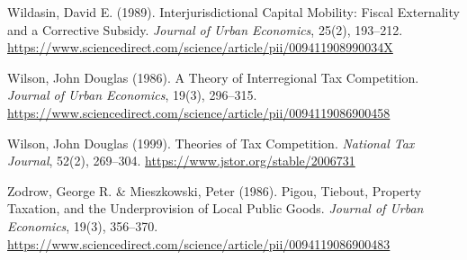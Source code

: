 \documentclass[sn-mathphys-ay]{sn-jnl} %
\theoremstyle{remark}
\begin{document}
\begin{thebibliography}{}
Wildasin, David E. (1989).
\newblock Interjurisdictional Capital Mobility: Fiscal Externality and a Corrective Subsidy.
\newblock \emph{Journal of Urban Economics}, 25(2), 193--212.
\newblock \url{https://www.sciencedirect.com/science/article/pii/009411908990034X}

Wilson, John Douglas (1986).
\newblock A Theory of Interregional Tax Competition.
\newblock \emph{Journal of Urban Economics}, 19(3), 296--315.
\newblock \url{https://www.sciencedirect.com/science/article/pii/0094119086900458}

Wilson, John Douglas (1999).
\newblock Theories of Tax Competition.
\newblock \emph{National Tax Journal}, 52(2), 269--304.
\newblock \url{https://www.jstor.org/stable/2006731}

Zodrow, George R. \& Mieszkowski, Peter (1986).
\newblock Pigou, Tiebout, Property Taxation, and the Underprovision of Local Public Goods.
\newblock \emph{Journal of Urban Economics}, 19(3), 356--370.
\newblock \url{https://www.sciencedirect.com/science/article/pii/0094119086900483}

\end{thebibliography}
\end{document}
